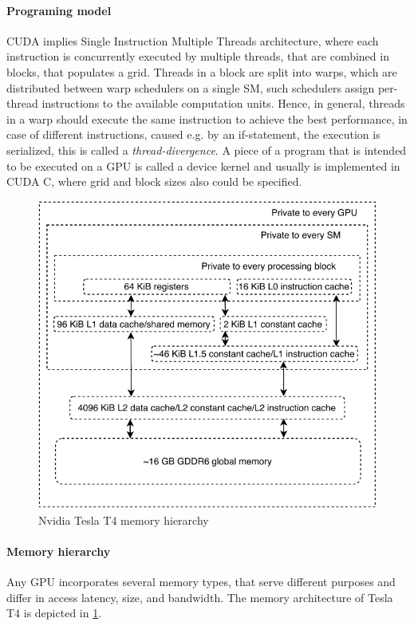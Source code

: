 \paragraph*{Programing model}
CUDA implies Single Instruction Multiple Threads architecture, where each instruction is concurrently executed by multiple threads, that are combined in blocks, that populates a grid. Threads in a block are split into warps, which are distributed between warp schedulers on a single SM, such schedulers assign per-thread instructions to the available computation units. Hence, in general, threads in a warp should execute the same instruction to achieve the best performance, in case of different instructions, caused e.g. by an if-statement, the execution is serialized, this is called a \emph{thread-divergence}. A piece of a program that is intended to be executed on a GPU is called a device kernel and usually is implemented in CUDA C, where grid and block sizes also could be specified.

\begin{figure}[t]
    \centering
    \includegraphics{figures/TeslaT4Mem.pdf}
    \caption{Nvidia Tesla T4 memory hierarchy~\cite{TeslaT4Bench}}
    \label{fig:t4_mem}
\end{figure}

\paragraph*{Memory hierarchy}
Any GPU incorporates several memory types, that serve different purposes and differ in access latency, size, and bandwidth.
The memory architecture of Tesla T4 is depicted in \ref{fig:t4_mem}.

